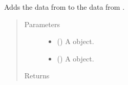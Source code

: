 \documentclass[letterpaper,10pt,openany,oneside,english]{sphinxmanual}
\begin{document}
\begin{fulllineitems}
\label{\detokenize{additional_functions:fredpy.plus}}
Adds the data from  to the data from .
\begin{quote}\begin{description}
\item[{Parameters}] \leavevmode\begin{itemize}
\item {} 
 ({\hyperref[\detokenize{series_class:fredpy.series}]{}}) \textendash{} A {\hyperref[\detokenize{series_class:fredpy.series}]{}} object.

\item {} 
 ({\hyperref[\detokenize{series_class:fredpy.series}]{}}) \textendash{} A {\hyperref[\detokenize{series_class:fredpy.series}]{}} object.

\end{itemize}

\item[{Returns}] \leavevmode
{\hyperref[\detokenize{series_class:fredpy.series}]{}}

\end{description}\end{quote}

\end{fulllineitems}

\end{document}
